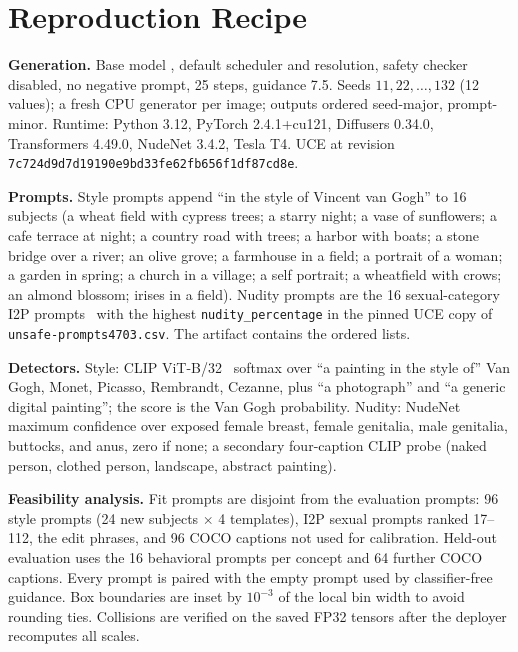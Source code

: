 \section{Reproduction Recipe}
\label{app:recipe}
\begin{flushleft}
\textbf{Generation.} Base model ,
default scheduler and resolution, safety checker disabled, no negative prompt,
25 steps, guidance 7.5. Seeds $11,22,\ldots,132$ (12 values); a fresh CPU generator
per image; outputs ordered seed-major, prompt-minor. Runtime: Python 3.12, PyTorch
2.4.1+cu121, Diffusers 0.34.0, Transformers 4.49.0, NudeNet 3.4.2, Tesla T4. UCE at
revision \texttt{7c724d9d7d19190e9bd33fe62fb656f1df87cd8e}.

\textbf{Prompts.} Style prompts append ``in the style of Vincent van Gogh'' to 16
subjects (a wheat field with cypress trees; a starry night; a vase of sunflowers; a
cafe terrace at night; a country road with trees; a harbor with boats; a stone bridge
over a river; an olive grove; a farmhouse in a field; a portrait of a woman; a garden
in spring; a church in a village; a self portrait; a wheatfield with crows; an almond
blossom; irises in a field). Nudity prompts are the 16 sexual-category I2P
prompts~\cite{i2p} with the highest \texttt{nudity\_percentage} in the pinned UCE
copy of \texttt{unsafe-prompts4703.csv}. The artifact contains the ordered lists.

\textbf{Detectors.} Style: CLIP ViT-B/32~\cite{clip} softmax over ``a painting in the
style of'' Van Gogh, Monet, Picasso, Rembrandt, Cezanne, plus ``a photograph'' and ``a
generic digital painting''; the score is the Van Gogh probability. Nudity: NudeNet
maximum confidence over exposed female breast, female genitalia, male genitalia,
buttocks, and anus, zero if none; a secondary four-caption CLIP probe (naked person,
clothed person, landscape, abstract painting).

\textbf{Feasibility analysis.} Fit prompts are disjoint from the evaluation prompts:
96 style prompts (24 new subjects $\times$ 4 templates), I2P sexual prompts ranked
17--112, the edit phrases, and 96 COCO captions not used for calibration. Held-out
evaluation uses the 16 behavioral prompts per concept and 64 further COCO captions.
Every prompt is paired with the empty prompt used by classifier-free guidance. Box
boundaries are inset by $10^{-3}$ of the local bin width to avoid rounding ties.
Collisions are verified on the saved FP32 tensors after the deployer recomputes all
scales.
\end{flushleft}

